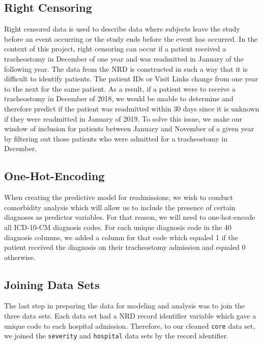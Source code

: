 \documentclass[sn-basic,pdflatex]{sn-jnl}
\theoremstyle{remark}
\theoremstyle{definition}
\begin{document}
\hypertarget{sec2C}{%
\subsection{Right Censoring}\label{sec2C}}

Right censored data is used to describe data where subjects leave the
study before an event occurring or the study ends before the event has
occurred. In the context of this project, right censoring can occur if a
patient received a tracheostomy in December of one year and was
readmitted in January of the following year. The data from the NRD is
constructed in such a way that it is difficult to identify patients. The
patient IDs or Visit Links change from one year to the next for the same
patient. As a result, if a patient were to receive a tracheostomy in
December of 2018, we would be unable to determine and therefore predict
if the patient was readmitted within 30 days since it is unknown if they
were readmitted in January of 2019. To solve this issue, we make our
window of inclusion for patients between January and November of a given
year by filtering out those patients who were admitted for a
tracheostomy in December.

\hypertarget{sec2D}{%
\subsection{One-Hot-Encoding}\label{sec2D}}

When creating the predictive model for readmissions, we wish to conduct
comorbidity analysis which will allow us to include the presence of
certain diagnoses as predictor variables. For that reason, we will need
to one-hot-encode all ICD-10-CM diagnosis codes. For each unique
diagnosis code in the 40 diagnosis columns, we added a column for that
code which equaled 1 if the patient received the diagnosis on their
tracheostomy admission and equaled 0 otherwise.

\hypertarget{sec2E}{%
\subsection{Joining Data Sets}\label{sec2E}}

The last step in preparing the data for modeling and analysis was to
join the three data sets. Each data set had a NRD record identifier
variable which gave a unique code to each hospital admission. Therefore,
to our cleaned \texttt{core} data set, we joined the \texttt{severity}
and \texttt{hospital} data sets by the record identifier.
\end{document}
